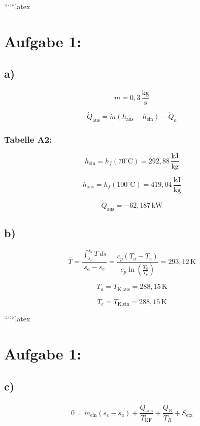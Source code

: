 
``````latex


\section*{Aufgabe 1:}

\subsection*{a)}

\[
\dot{m} = 0{,}3 \, \frac{\text{kg}}{\text{s}}
\]

\[
\dot{Q}_{\text{aus}} = \dot{m} \left( h_{\text{aus}} - h_{\text{ein}} \right) - \dot{Q}_{a}
\]

\subsubsection*{Tabelle A2:}

\[
h_{\text{ein}} = h_f \left( 70^\circ \text{C} \right) = 292{,}88 \, \frac{\text{kJ}}{\text{kg}}
\]

\[
h_{\text{aus}} = h_f \left( 100^\circ \text{C} \right) = 419{,}04 \, \frac{\text{kJ}}{\text{kg}}
\]

\[
\dot{Q}_{\text{aus}} = -62{,}187 \, \text{kW}
\]

\subsection*{b)}

\[
\overline{T} = \frac{\int_{s_e}^{s_a} T \, ds}{s_a - s_e} = \frac{c_p \left( T_a - T_e \right)}{c_p \ln \left( \frac{T_a}{T_e} \right)} = 293{,}12 \, \text{K}
\]

\[
T_a = T_{\text{K,aus}} = 288{,}15 \, \text{K}
\]

\[
T_e = T_{\text{K,ein}} = 288{,}15 \, \text{K}
\]

``````latex


\section*{Aufgabe 1:}

\subsection*{c)}

\begin{equation*}
0 = \dot{m}_{\text{ein}} (s_e - s_a) + \frac{\dot{Q}_{\text{aus}}}{T_{\text{KF}}} + \frac{\dot{Q}_R}{T_R} + S_{\text{erz}}
\end{equation*}

